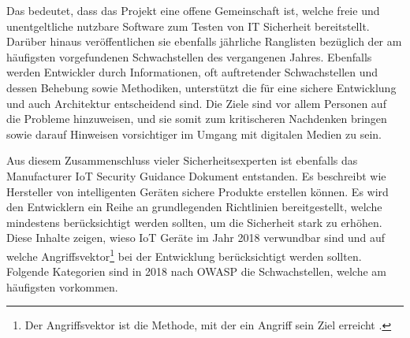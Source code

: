     Das bedeutet, dass das Projekt eine offene Gemeinschaft ist, welche freie und unentgeltliche nutzbare Software zum Testen von IT Sicherheit bereitstellt. Darüber hinaus veröffentlichen sie ebenfalls jährliche Ranglisten bezüglich der am häufigsten vorgefundenen Schwachstellen des vergangenen Jahres. Ebenfalls werden Entwickler durch Informationen, oft auftretender Schwachstellen und dessen Behebung sowie Methodiken, unterstützt die für eine sichere Entwicklung und auch Architektur entscheidend sind. Die Ziele sind vor allem Personen auf die Probleme hinzuweisen, und sie somit zum kritischeren Nachdenken bringen sowie darauf Hinweisen vorsichtiger im Umgang mit digitalen Medien zu sein.
    
    Aus diesem Zusammenschluss vieler Sicherheitsexperten ist ebenfalls das Manufacturer \ac{IoT} Security Guidance Dokument \cite{stahl_2017} entstanden. Es beschreibt wie Hersteller von intelligenten Geräten sichere Produkte erstellen können. Es wird den Entwicklern ein Reihe an grundlegenden Richtlinien bereitgestellt, welche mindestens berücksichtigt werden sollten, um die Sicherheit stark zu erhöhen.
    Diese Inhalte zeigen, wieso \ac{IoT} Geräte im Jahr 2018 verwundbar sind und auf welche Angriffsvektor\footnote{Der Angriffsvektor ist die Methode, mit der ein Angriff sein Ziel erreicht \cite{HANSMAN200531}.} bei der Entwicklung berücksichtigt werden sollten. 
    Folgende Kategorien sind in 2018 nach \ac{OWASP} die Schwachstellen, welche am häufigsten vorkommen. 
